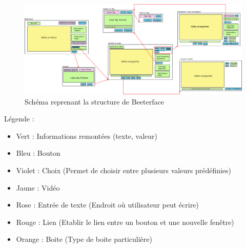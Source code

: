 \documentclass[11pt,french,a4paper]{report}
\begin{document}
\begin{landscape}
\begin{figure}[!h]
\begin{center}
\includegraphics[scale=0.3]{../images/dia/schema_interface.png}
    \caption{Schéma reprenant la structure de Beeterface}
    \label{sch_beeterface}
\end{center}
\end{figure}

\Large Légende : \normalsize \\ 
    \begin{multicols}{2}
        \begin{itemize}[label=, leftmargin=*,parsep=0cm,itemsep=0cm,topsep=0cm]
        \item Vert : Informations remontées (texte, valeur)
        \item Bleu : Bouton
        \item Violet : Choix (Permet de choisir entre plusieurs valeurs prédéfinies)
        \item Jaune : Vidéo
        \item Rose : Entrée de texte (Endroit où utilisateur peut écrire)
        \item Rouge : Lien (Etablir le lien entre un bouton et une nouvelle fenêtre)
        \item Orange : Boite (Type de boite particulière)
    \end{itemize}
    \end{multicols}
\end{landscape}
    \setlength{\columnseprule}{0,1}

\dotfill \\
\end{document}
